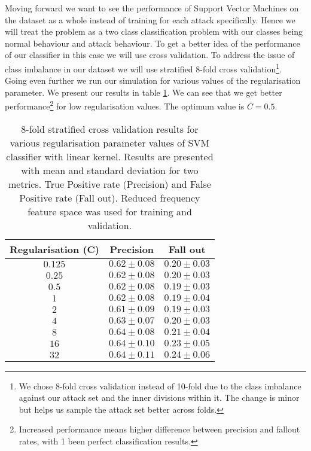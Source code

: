 \documentclass[reqno,openany,12pt]{amsbook}
\begin{document}
Moving forward we want to see the performance of Support Vector Machines on the dataset as a whole instead of training for each attack specifically. Hence we will treat the problem as a two class classification problem with our classes being normal behaviour and attack behaviour. To get a better idea of the performance of our classifier in this case we will use cross validation. To address the issue of class imbalance in our dataset we will use stratified 8-fold cross validation\footnote{We chose 8-fold cross validation instead of 10-fold due to the class imbalance against our attack set and the inner divisions within it. The change is minor but helps us sample the attack set better across folds.}. Going even further we run our simulation for various values of the regularisation parameter. We present our results in table \ref{svmt3}. We can see that we get better performance\footnote{Increased performance means higher difference between precision and fallout rates, with 1 been perfect classification results.} for low regularisation values. The optimum value is $C=0.5$.


\begin{table}
\begin{tabular}{|c|c|c|}
\hline
Regularisation (C) &  Precision & Fall out \\ \hline 
$0.125$ &  $0.62 \pm 0.08$ & $0.20 \pm 0.03$ \\ \hline 
$0.25$ &  $0.62 \pm 0.08$ & $0.20 \pm 0.03$ \\ \hline 
$0.5$ &  $0.62 \pm 0.08$ & $0.19 \pm 0.03$ \\ \hline 
$1$ &  $0.62 \pm 0.08$ & $0.19 \pm 0.04$ \\ \hline 
$2$ &  $0.61 \pm 0.09$ & $0.19 \pm 0.03$ \\ \hline 
$4$ &  $0.63 \pm 0.07$ & $0.20 \pm 0.03$ \\ \hline 
$8$ &  $0.64 \pm 0.08$ & $0.21 \pm 0.04$ \\ \hline 
$16$ &  $0.64 \pm 0.10$ & $0.23 \pm 0.05$ \\ \hline 
$32$ &  $0.64 \pm 0.11$ & $0.24 \pm 0.06$ \\ \hline
\end{tabular}
\vspace{5pt}
\caption[Cross Validation and Linear SVM regularisation on reduced frequency feature space.]{8-fold stratified cross validation results for various regularisation parameter values of SVM classifier with linear kernel. Results are presented with mean and standard deviation for two metrics. True Positive rate (Precision) and False Positive rate (Fall out). Reduced frequency feature space was used for training and validation.}
\label{svmt3}
\end{table}
\end{document}
